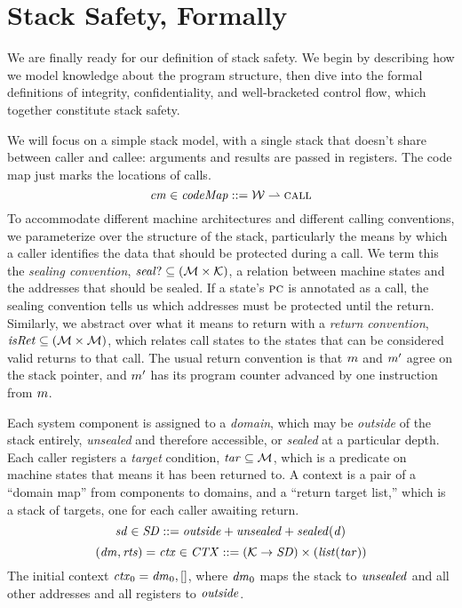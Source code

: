 \documentclass[acmsmall,review,anonymous]{acmart}\settopmatter{printfolios=true,printccs=false,printacmref=false}
\begin{document}
{{\section{Stack Safety, Formally}
\label{sec:lse}

We are finally ready for our definition of stack safety. We begin
by describing how we model knowledge about the program structure,
then dive into the formal definitions of integrity, confidentiality, and
well-bracketed control flow, which together constitute stack safety.

We will focus on a simple stack model, with a single stack
that doesn't share between caller and callee: arguments and results are passed
in registers. The code map just marks the locations of calls.
\[\mathit{cm} \in \mathit{codeMap} ::= {\mathcal W} \rightharpoonup \text{\sc call}\]
To accommodate different machine architectures and different calling
conventions, we parameterize over the structure of the stack, particularly
the means by
which a caller identifies the data that should be protected during a call. We term
this the {\em sealing convention},
\(\mathit{seal?} \subseteq ({\mathcal M} \times {\mathcal K})\),
a relation between machine states and the addresses that should be sealed.
If a state's \(\textsc{pc}\) is annotated as a call, the sealing convention tells us
which addresses must be protected until the return. Similarly, we abstract over what
it means to return with a {\em return convention},
\(\mathit{isRet} \subseteq ({\mathcal M} \times {\mathcal M})\),
which relates call states to the states that can be considered valid returns to that call.
The usual return convention is that \(m\) and \(m'\) agree on the stack pointer,
and \(m'\) has its program counter advanced by one instruction from \(m\).

Each system component is assigned to a {\em domain}, which may be {\em outside}
of the stack entirely, {\em unsealed} and therefore accessible, or {\em sealed}
at a particular depth. Each caller registers a {\em target}
condition, \(\mathit{tar} \subseteq {\mathcal M}\), which is a predicate on machine states that means it
has been returned to.
A context is a pair of a ``domain map'' from components to domains, and a
``return target list,'' which is a stack of targets, one for each caller awaiting
return.
%
\[\mathit{sd} \in \mathit{SD} ::= \mathit{outside} + \mathit{unsealed} + \mathit{sealed(d)}\]
\[(\mathit{dm},\mathit{rts}) = \mathit{ctx} \in \mathit{CTX} ::= ({\mathcal K} \rightarrow \mathit{SD})
  \times (\mathit{list} (\mathit{tar})) \]
%
The initial context \(\mathit{ctx}_0 = \mathit{dm}_0, []\), where \(\mathit{dm}_0\) maps
the stack to \(\mathit{unsealed}\) and all other addresses and all registers to \(\mathit{outside}\).


}}
\end{document}
